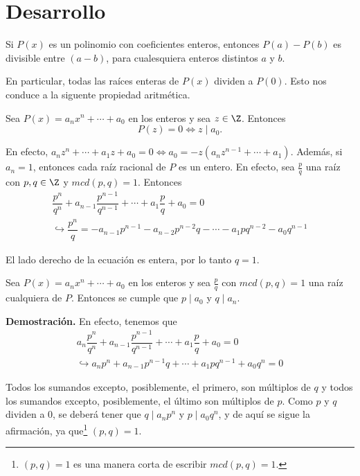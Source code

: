 \section{Desarrollo}

\begin{theorem}
    Si $P(x)$ es un polinomio con coeficientes enteros, entonces $P(a) - P(b)$ es divisible entre $(a - b)$, para cualesquiera enteros distintos $a$ y $b$.
\end{theorem}

En particular, todas las raíces enteras de $P(x)$ dividen a $P(0)$.
Esto nos conduce a la siguente propiedad aritmética.

\begin{section-definition}
    Sea $P(x) = a_n x^n + \cdots + a_0$ en los enteros y sea $z \in \Z$.
    Entonces \[P(z) = 0 \Leftrightarrow z \mid a_0.\]
\end{section-definition}

En efecto, $a_n z^n + \cdots + a_1 z + a_0 = 0 \Leftrightarrow a_0 = -z(a_n z^{n - 1} + \cdots + a_1)$.
Además, si $a_n = 1$, entonces cada raíz racional de $P$ es un entero. En efecto, sea $\frac{p}{q}$ una raíz con $p, q \in \Z$ y $mcd(p, q) = 1$.
Entonces
\begin{gather*}
    \dfrac{p^n}{q^n} + a_{n - 1} \dfrac{p^{n - 1}}{q^{n - 1}} + \cdots + a_1 \dfrac{p}{q} + a_0  = 0 \\
    \hookrightarrow \dfrac{p^n}{q} = - a_{n - 1} p^{n - 1} - a_{n - 2} p^{n - 2} q - \cdots - a_1 p q^{n - 2} - a_0 q^{n - 1}
\end{gather*}

El lado derecho de la ecuación es entera, por lo tanto $q = 1$.

\begin{theorem}
    Sea $P(x) = a_n x^n + \cdots + a_0$ en los enteros y sea $\frac{p}{q}$ con $mcd(p, q) = 1$ una raíz cualquiera de $P$.
    Entonces se cumple que $p \mid a_0$ y $q \mid a_n$.
\end{theorem}

\textbf{Demostración.} En efecto, tenemos que
\begin{gather*}
    a_n \dfrac{p^n}{q^n} + a_{n - 1} \dfrac{p^{n - 1}}{q^{n - 1}} + \cdots + a_1 \dfrac{p}{q} + a_0  = 0 \\
    \hookrightarrow a_n p^n + a_{n - 1}p^{n - 1}q + \cdots + a_1 p q^{n - 1} + a_0 q^n = 0
\end{gather*}

Todos los sumandos excepto, posiblemente, el primero, son múltiplos de $q$ y todos los sumandos excepto, posiblemente, el último son múltiplos de $p$.
Como $p$ y $q$ dividen a 0, se deberá tener que $q \mid a_n p^n$ y $p \mid a_0 q^n$, y de aquí se sigue la afirmación, ya que\footnote{$(p, q) =  1$ es una manera corta de escribir $mcd(p, q) = 1$.} $(p, q) = 1$.

